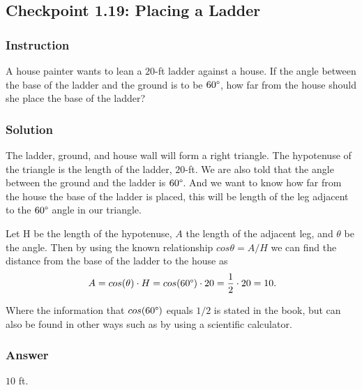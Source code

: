 \subsection*{Checkpoint 1.19: Placing a Ladder}

\subsubsection*{Instruction}

A house painter wants to lean a $20$-ft ladder against a house. If the angle between the base of the ladder and the ground is to be $ 60 \degree $, how far from the house should she place the base of the ladder?

\subsubsection*{Solution}

The ladder, ground, and house wall will form a right triangle. The hypotenuse of the triangle is the length of the ladder, $20$-ft. We are also told that the angle between the ground and the ladder is $ 60 \degree $. And we want to know how far from the house the base of the ladder is placed, this will be length of the leg adjacent to the $ 60 \degree $ angle in our triangle.

Let H be the length of the hypotenuse, $A$ the length of the adjacent leg, and $ \theta $ be the angle. Then by using the known relationship $ cos \theta = A/H $ we can find the distance from the base of the ladder to the house as
\[ \phantom{.} A = cos(\theta) \cdot H = cos(60 \degree ) \cdot 20 = \frac{1}{2} \cdot 20 = 10 \text{.} \]

Where the information that $cos(60 \degree)$ equals $ 1/2 $ is stated in the book, but can also be found in other ways such as by using a scientific calculator.

\subsubsection*{Answer}

$10$ ft.
